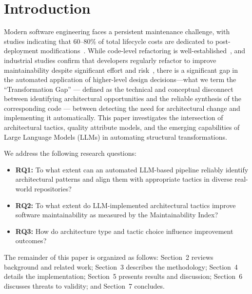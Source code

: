 \documentclass[sigconf,review,anonymous]{acmart}
\begin{document}

\maketitle

\section{Introduction}

Modern software engineering faces a persistent maintenance challenge, with studies indicating that 60--80\% of total lifecycle costs are dedicated to post-deployment modifications~\cite{bass2021software}. While code-level refactoring is well-established~\cite{fowler2018refactoring}, and industrial studies confirm that developers regularly refactor to improve maintainability despite significant effort and risk~\cite{kim2014refactoring}, there is a significant gap in the automated application of higher-level design decisions---what we term the ``Transformation Gap'' --- defined as the technical and conceptual disconnect between identifying architectural opportunities and the reliable synthesis of the corresponding code --- between detecting the need for architectural change and implementing it automatically. This paper investigates the intersection of architectural tactics, quality attribute models, and the emerging capabilities of Large Language Models (LLMs) in automating structural transformations.

We address the following research questions:
\begin{itemize}[nosep]
    \item \textbf{RQ1:} To what extent can an automated LLM-based pipeline reliably identify architectural patterns and align them with appropriate tactics in diverse real-world repositories?
    \item \textbf{RQ2:} To what extent do LLM-implemented architectural tactics improve software maintainability as measured by the Maintainability Index?
    \item \textbf{RQ3:} How do architecture type and tactic choice influence improvement outcomes?
\end{itemize}

The remainder of this paper is organized as follows: Section~2 reviews background and related work; Section~3 describes the methodology; Section~4 details the implementation; Section~5 presents results and discussion; Section~6 discusses threats to validity; and Section~7 concludes.
\end{document}
